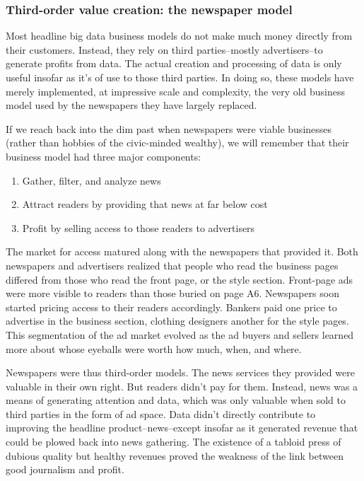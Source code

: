 \documentclass[12pt]{article}
\begin{document}
\subsubsection{Third-order value creation: the newspaper model}
\label{sec:third-order-value}

Most headline big data business models do not make much money directly from
their customers. Instead, they rely on third parties--mostly
advertisers--to generate profits from data. The actual creation and
processing of data is only useful insofar as it's of use to those
third parties. In doing so, these models have merely implemented, at
impressive scale and complexity, the very old business model used by
the newspapers they have largely replaced.

If we reach back into the dim past when newspapers were viable
businesses (rather than hobbies of the civic-minded wealthy), we will
remember that their business model had three major components:

\begin{enumerate}
\item Gather, filter, and analyze news
\item Attract readers by providing that news at far below cost
\item Profit by selling access to those readers to advertisers
\end{enumerate}

The market for access matured along with the newspapers that provided
it. Both newspapers and advertisers realized that people who read the business
pages differed from those who read the front page, or the style
section. Front-page ads were more visible to readers than those buried
on page A6. Newspapers soon started pricing access to their readers
accordingly. Bankers paid one price to advertise in the business
section, clothing designers another for the style pages. This
segmentation of the ad market evolved as the ad buyers and sellers
learned more about whose eyeballs were worth how much, when, and
where.

Newspapers were thus third-order models. The news services they
provided were valuable in their own right. But readers didn't pay for
them. Instead, news was a means of generating attention and data,
which was only valuable when sold to third parties in the form of ad
space. Data didn't directly contribute to improving the headline
product--news--except insofar as it generated revenue that could be plowed
back into news gathering. The existence of a tabloid press of dubious
quality but healthy revenues proved the weakness of the link between
good journalism and profit.
\end{document}
